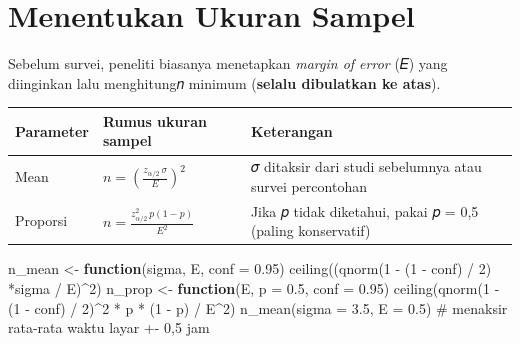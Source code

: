 \documentclass[
  indonesian,
  letterpaper,
]{book}
\newenvironment{Shaded}{\begin{snugshade}}{\end{snugshade}}
\newcommand{\AttributeTok}[1]{\textcolor[rgb]{0.40,0.45,0.13}{#1}}
\newcommand{\CommentTok}[1]{\textcolor[rgb]{0.37,0.37,0.37}{#1}}
\newcommand{\ControlFlowTok}[1]{\textcolor[rgb]{0.00,0.23,0.31}{\textbf{#1}}}
\newcommand{\DecValTok}[1]{\textcolor[rgb]{0.68,0.00,0.00}{#1}}
\newcommand{\FloatTok}[1]{\textcolor[rgb]{0.68,0.00,0.00}{#1}}
\newcommand{\FunctionTok}[1]{\textcolor[rgb]{0.28,0.35,0.67}{#1}}
\newcommand{\NormalTok}[1]{\textcolor[rgb]{0.00,0.23,0.31}{#1}}
\newcommand{\OtherTok}[1]{\textcolor[rgb]{0.00,0.23,0.31}{#1}}
\newcommand{\SpecialCharTok}[1]{\textcolor[rgb]{0.37,0.37,0.37}{#1}}
\newcounter{none} %
\begin{document}
\chapter{Menentukan Ukuran Sampel}\label{menentukan-ukuran-sampel}

Sebelum survei, peneliti biasanya menetapkan \emph{margin of error} (𝐸)
yang diinginkan lalu menghitung𝑛 minimum (\textbf{selalu dibulatkan ke
atas}).

{\def\LTcaptype{none} %
\begin{longtable}[]{@{}
  >{\raggedright\arraybackslash}p{}
  >{\raggedright\arraybackslash}p{}
  >{\raggedright\arraybackslash}p{}@{}}
\toprule\noalign{}
\begin{minipage}[b]{\linewidth}\raggedright
Parameter
\end{minipage} & \begin{minipage}[b]{\linewidth}\raggedright
Rumus ukuran sampel
\end{minipage} & \begin{minipage}[b]{\linewidth}\raggedright
Keterangan
\end{minipage} \\
\midrule\noalign{}
\endhead
\bottomrule\noalign{}
\endlastfoot
Mean & \(n = \left( \frac{z_{\alpha/2} \, \sigma}{E} \right)^2\) & 𝜎
ditaksir dari studi sebelumnya atau survei percontohan \\
Proporsi & \(n = \frac{z_{\alpha/2}^2 \, p(1 - p)}{E^2}\) & Jika 𝑝 tidak
diketahui, pakai 𝑝 = 0,5 (paling konservatif) \\
\end{longtable}
}

\begin{Shaded}
\begin{Highlighting}[]
\NormalTok{n\_mean }\OtherTok{\textless{}{-}} \ControlFlowTok{function}\NormalTok{(sigma, E, }\AttributeTok{conf =} \FloatTok{0.95}\NormalTok{) }\FunctionTok{ceiling}\NormalTok{((}\FunctionTok{qnorm}\NormalTok{(}\DecValTok{1} \SpecialCharTok{{-}}\NormalTok{ (}\DecValTok{1} \SpecialCharTok{{-}}\NormalTok{ conf) }\SpecialCharTok{/} \DecValTok{2}\NormalTok{) }\SpecialCharTok{*}\NormalTok{sigma }\SpecialCharTok{/}\NormalTok{ E)}\SpecialCharTok{\^{}}\DecValTok{2}\NormalTok{)}
\NormalTok{n\_prop }\OtherTok{\textless{}{-}} \ControlFlowTok{function}\NormalTok{(E, }\AttributeTok{p =} \FloatTok{0.5}\NormalTok{, }\AttributeTok{conf =} \FloatTok{0.95}\NormalTok{) }\FunctionTok{ceiling}\NormalTok{(}\FunctionTok{qnorm}\NormalTok{(}\DecValTok{1} \SpecialCharTok{{-}}\NormalTok{ (}\DecValTok{1} \SpecialCharTok{{-}}\NormalTok{ conf) }\SpecialCharTok{/} \DecValTok{2}\NormalTok{)}\SpecialCharTok{\^{}}\DecValTok{2} \SpecialCharTok{*}\NormalTok{ p }\SpecialCharTok{*}\NormalTok{ (}\DecValTok{1} \SpecialCharTok{{-}}\NormalTok{ p) }\SpecialCharTok{/}\NormalTok{ E}\SpecialCharTok{\^{}}\DecValTok{2}\NormalTok{)}
\FunctionTok{n\_mean}\NormalTok{(}\AttributeTok{sigma =} \FloatTok{3.5}\NormalTok{, }\AttributeTok{E =} \FloatTok{0.5}\NormalTok{) }\CommentTok{\# menaksir rata{-}rata waktu layar +{-} 0,5 jam}
\end{Highlighting}
\end{Shaded}
\end{document}
